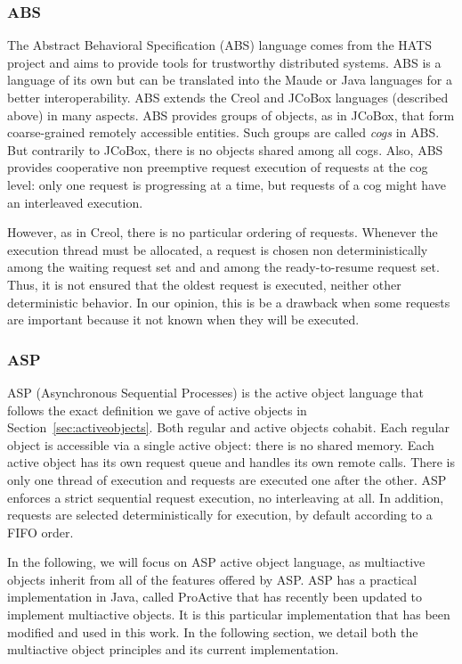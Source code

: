 \documentclass[11pt]{report}
\begin{document}
\subsubsection{ABS}\label{sec:ABS}
The Abstract Behavioral Specification (ABS) language \cite{ref:abs} comes from the HATS \cite{ref:hats} project and aims to provide tools for trustworthy distributed systems. ABS is a language of its own but can be translated into the Maude or Java languages for a better interoperability.
ABS extends the Creol and JCoBox languages (described above) in many aspects. ABS provides groups of objects, as in JCoBox, that form coarse-grained remotely accessible entities. Such groups are called \emph{cogs} in ABS. But contrarily to JCoBox, there is no objects shared among all cogs. Also, ABS provides cooperative non preemptive request execution of requests at the cog level: only one request is progressing at a time, but requests of a cog might have an interleaved execution. 

However, as in Creol, there is no particular ordering of requests. Whenever the execution thread must be allocated, a request is chosen non deterministically among the waiting request set and and among the ready-to-resume request set. 
Thus, it is not ensured that the oldest request is executed, neither other deterministic behavior. In our opinion, this is be a drawback when some requests are important because it not known when they will be executed.

\subsubsection{ASP}
ASP (Asynchronous Sequential Processes) \cite{ref:asp} is the active object language that follows the exact definition we gave of active objects in Section~\ref{sec:activeobjects}. Both regular and active objects cohabit. Each regular object is accessible via a single active object: there is no shared memory. Each active object has its own request queue and handles its own remote calls. There is only one thread of execution and requests are executed one after the other. ASP enforces a strict sequential request execution, no interleaving at all.
In addition, requests are selected deterministically for execution, by default according to a FIFO order. 

In the following, we will focus on  ASP active object language, as multiactive objects inherit from all of the features offered by ASP. ASP has a practical implementation in Java, called ProActive \cite{ref:proactive} that has recently been updated to implement multiactive objects. It is this particular implementation that has been modified and used in this work. In the following section, we detail both the multiactive object principles and its current implementation.
\end{document}
